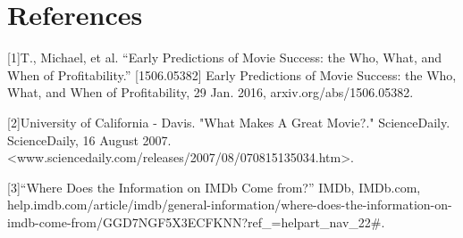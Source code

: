 \documentclass[11pt]{article}
\begin{document}
\hypertarget{references}{%
	\section{References}\label{references}}
\begin{description}

\item{[1]}\quad T., Michael, et al. “Early Predictions of Movie Success: the Who, What, and When of Profitability.” [1506.05382] Early Predictions of Movie Success: the Who, What, and When of Profitability, 29 Jan. 2016, arxiv.org/abs/1506.05382. 

\item{[2]}\quad University of California - Davis. "What Makes A Great Movie?." ScienceDaily. ScienceDaily, 16 August 2007. <www.sciencedaily.com/releases/2007/08/070815135034.htm>.

\item{[3]}\quad “Where Does the Information on IMDb Come from?” IMDb, IMDb.com, help.imdb.com/article/imdb/general-information/where-does-the-information-on-imdb-come-from/GGD7NGF5X3ECFKNN?ref\_=helpart\_nav\_22\#.
\end{description}
	
\end{document}
